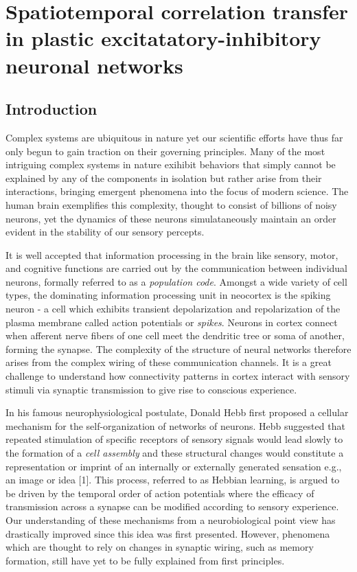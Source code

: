 \documentclass{ucetd}
\begin{document}
\mainmatter

\chapter{Spatiotemporal correlation transfer in plastic excitatatory-inhibitory neuronal networks}

\section{Introduction}

Complex systems are ubiquitous in nature yet our scientific efforts have thus far only begun to gain traction on their governing principles. Many of the most intriguing complex systems in nature exihibit behaviors that simply cannot be explained by any of the components in isolation but rather arise from their interactions, bringing emergent phenomena into the focus of modern science. The human brain exemplifies this complexity, thought to consist of billions of noisy neurons, yet the dynamics of these neurons simulataneously maintain an order evident in the stability of our sensory percepts.

It is well accepted that information processing in the brain like sensory, motor, and cognitive functions are carried out by the communication between individual neurons, formally referred to as a \emph{population code}. Amongst a wide variety of cell types, the dominating information processing unit in neocortex is the spiking neuron - a  cell which exhibits transient depolarization and repolarization of the plasma membrane called action potentials or \emph{spikes}.  Neurons in cortex connect when afferent nerve fibers of one cell meet the dendritic tree or soma of another, forming the synapse. The complexity of the structure of neural networks therefore arises from the complex wiring of these communication channels. It is a great challenge to understand how connectivity patterns in cortex interact with sensory stimuli via synaptic transmission to give rise to conscious experience. 

In his famous neurophysiological postulate, Donald Hebb first proposed a cellular mechanism for the self-organization of networks of neurons. Hebb suggested that repeated stimulation of specific receptors of sensory signals would lead slowly to the formation of a \emph{cell assembly} and these structural changes would constitute a representation or imprint of an internally or externally generated sensation e.g., an image or idea [1]. This process, referred to as Hebbian learning, is argued to be driven by the temporal order of action potentials where the efficacy of transmission across a synapse can be modified according to sensory experience. Our understanding of these mechanisms from a neurobiological point view has drastically improved since this idea was first presented. However, phenomena which are thought to rely on changes in synaptic wiring, such as memory formation, still have yet to be fully explained from first principles.
\end{document}
